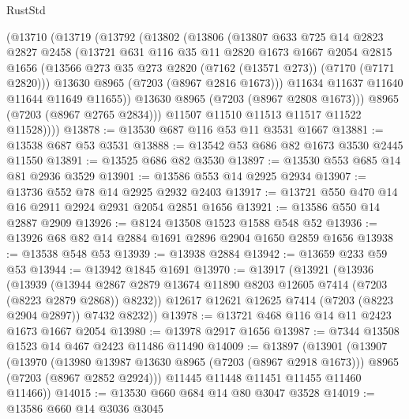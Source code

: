 \begin{lexlean}{RustStd}
\begin{coremodule}
        (@13710
          (@13719
            (@13792
              (@13802
                (@13806
                  (@13807
                    @633
                    @725
                    @14
                    @2823
                    @2827
                    @2458
                    (@13721
                      @631
                      @116
                      @35
                      @11
                      @2820
                      @1673
                      @1667
                      @2054
                      @2815
                      @1656
                      (@13566 @273 @35 @273 @2820 (@7162 (@13571 @273)) (@7170 (@7171 @2820)))
                      @13630
                      @8965
                      (@7203 (@8967 @2816 @1673)))
                    @11634
                    @11637
                    @11640
                    @11644
                    @11649
                    @11655))
                @13630
                @8965
                (@7203 (@8967 @2808 @1673)))
              @8965
              (@7203 (@8967 @2765 @2834)))
            @11507
            @11510
            @11513
            @11517
            @11522
            @11528))))
@13878 := @13530 @687 @116 @53 @11 @3531 @1667
@13881 := @13538 @687 @53 @3531
@13888 := @13542 @53 @686 @82 @1673 @3530 @2445 @11550
@13891 := @13525 @686 @82 @3530
@13897 := @13530 @553 @685 @14 @81 @2936 @3529
@13901 := @13586 @553 @14 @2925 @2934
@13907 := @13736 @552 @78 @14 @2925 @2932 @2403
@13917 := @13721 @550 @470 @14 @16 @2911 @2924 @2931 @2054 @2851 @1656
@13921 := @13586 @550 @14 @2887 @2909
@13926 := @8124 @13508 @1523 @1588 @548 @52
@13936 := @13926 @68 @82 @14 @2884 @1691 @2896 @2904 @1650 @2859 @1656
@13938 := @13538 @548 @53
@13939 := @13938 @2884
@13942 := @13659 @233 @59 @53
@13944 := @13942 @1845 @1691
@13970 := @13917
    (@13921
      (@13936
        (@13939
          (@13944 @2867 @2879 @13674 @11890 @8203 @12605 @7414 (@7203 (@8223 @2879 @2868)) @8232))
        @12617
        @12621
        @12625
        @7414
        (@7203 (@8223 @2904 @2897))
        @7432
        @8232))
@13978 := @13721 @468 @116 @14 @11 @2423 @1673 @1667 @2054
@13980 := @13978 @2917 @1656
@13987 := @7344 @13508 @1523 @14 @467 @2423 @11486 @11490
@14009 := @13897
    (@13901
      (@13907
        (@13970
          (@13980 @13987 @13630 @8965 (@7203 (@8967 @2918 @1673)))
          @8965
          (@7203 (@8967 @2852 @2924)))
        @11445
        @11448
        @11451
        @11455
        @11460
        @11466))
@14015 := @13530 @660 @684 @14 @80 @3047 @3528
@14019 := @13586 @660 @14 @3036 @3045

\end{coremodule}
\end{lexlean}
